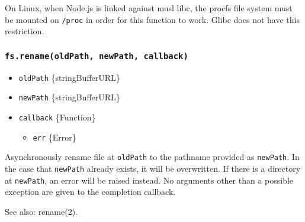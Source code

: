 On Linux, when Node.js is linked against musl libc, the procfs file
system must be mounted on \texttt{/proc} in order for this function to
work. Glibc does not have this restriction.

\subsubsection{\texorpdfstring{\texttt{fs.rename(oldPath,\ newPath,\ callback)}}{fs.rename(oldPath, newPath, callback)}}\label{fs.renameoldpath-newpath-callback}

\begin{itemize}
\tightlist
\item
  \texttt{oldPath} \{string\textbar Buffer\textbar URL\}
\item
  \texttt{newPath} \{string\textbar Buffer\textbar URL\}
\item
  \texttt{callback} \{Function\}

  \begin{itemize}
  \tightlist
  \item
    \texttt{err} \{Error\}
  \end{itemize}
\end{itemize}

Asynchronously rename file at \texttt{oldPath} to the pathname provided
as \texttt{newPath}. In the case that \texttt{newPath} already exists,
it will be overwritten. If there is a directory at \texttt{newPath}, an
error will be raised instead. No arguments other than a possible
exception are given to the completion callback.

See also: rename(2).

\begin{Shaded}
\begin{Highlighting}[]
 \OperatorTok{;}

\NormalTok{(}\OperatorTok{,} \OperatorTok{,}\KeywordTok{=\textgreater{}}\NormalTok{ \{}
  \OperatorTok{;}
  \NormalTok{(}\NormalTok{)}\OperatorTok{;}
\NormalTok{\})}\OperatorTok{;}
\end{Highlighting}
\end{Shaded}


